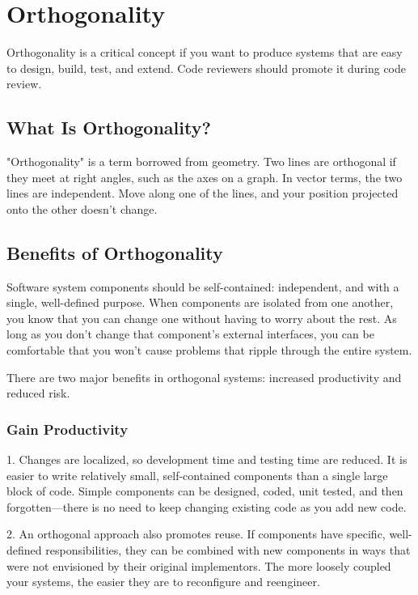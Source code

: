 
\chapter{Orthogonality}

Orthogonality is a critical concept if you want to produce systems that are easy to design, build, test, and extend. Code reviewers should promote it during code review.

\section{What Is Orthogonality?}

"Orthogonality" is a term borrowed from geometry. Two lines are orthogonal if they meet at right angles, such as the axes on a graph. In vector terms, the two lines are independent. Move along one of the lines, and your position projected onto the other doesn't change.

\section{Benefits of Orthogonality}

Software system components should be  self-contained: independent, and with a single, well-defined purpose. When components are isolated from one another, you know that you can change one without having to worry about the rest. As long as you don't change that component's external interfaces, you can be comfortable that you won't cause problems that ripple through the entire system.

There are two major benefits in orthogonal systems: increased productivity and reduced risk.

\subsection{Gain Productivity}

1. Changes are localized, so development time and testing time are reduced. It is easier to write relatively small, self-contained components than a single large block of code. Simple components can be designed, coded, unit tested, and then forgotten—there is no need to keep changing existing code as you add new code.

2. An orthogonal approach also promotes reuse. If components have specific, well-defined responsibilities, they can be combined with new components in ways that were not envisioned by their original implementors. The more loosely coupled your systems, the easier they are to reconfigure and reengineer.

